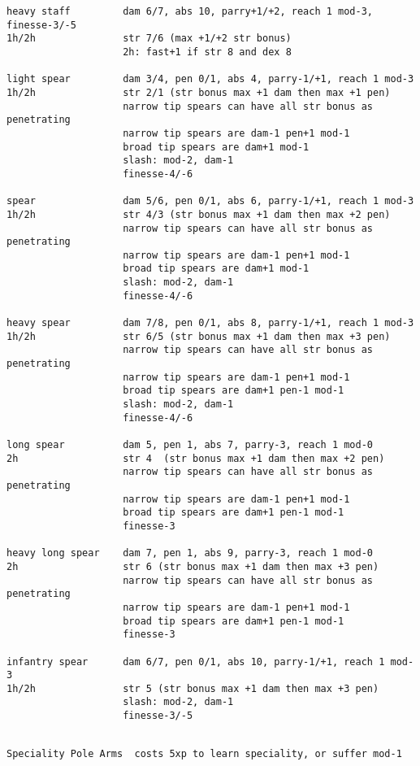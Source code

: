 \begin{verbatim}
heavy staff         dam 6/7, abs 10, parry+1/+2, reach 1 mod-3, finesse-3/-5
1h/2h               str 7/6 (max +1/+2 str bonus)
                    2h: fast+1 if str 8 and dex 8

light spear         dam 3/4, pen 0/1, abs 4, parry-1/+1, reach 1 mod-3
1h/2h               str 2/1 (str bonus max +1 dam then max +1 pen)
                    narrow tip spears can have all str bonus as penetrating
                    narrow tip spears are dam-1 pen+1 mod-1
                    broad tip spears are dam+1 mod-1
                    slash: mod-2, dam-1
                    finesse-4/-6

spear               dam 5/6, pen 0/1, abs 6, parry-1/+1, reach 1 mod-3
1h/2h               str 4/3 (str bonus max +1 dam then max +2 pen)
                    narrow tip spears can have all str bonus as penetrating
                    narrow tip spears are dam-1 pen+1 mod-1
                    broad tip spears are dam+1 mod-1
                    slash: mod-2, dam-1
                    finesse-4/-6

heavy spear         dam 7/8, pen 0/1, abs 8, parry-1/+1, reach 1 mod-3
1h/2h               str 6/5 (str bonus max +1 dam then max +3 pen)
                    narrow tip spears can have all str bonus as penetrating
                    narrow tip spears are dam-1 pen+1 mod-1
                    broad tip spears are dam+1 pen-1 mod-1
                    slash: mod-2, dam-1
                    finesse-4/-6

long spear          dam 5, pen 1, abs 7, parry-3, reach 1 mod-0
2h                  str 4  (str bonus max +1 dam then max +2 pen)
                    narrow tip spears can have all str bonus as penetrating
                    narrow tip spears are dam-1 pen+1 mod-1
                    broad tip spears are dam+1 pen-1 mod-1
                    finesse-3

heavy long spear    dam 7, pen 1, abs 9, parry-3, reach 1 mod-0
2h                  str 6 (str bonus max +1 dam then max +3 pen)
                    narrow tip spears can have all str bonus as penetrating
                    narrow tip spears are dam-1 pen+1 mod-1
                    broad tip spears are dam+1 pen-1 mod-1
                    finesse-3

infantry spear      dam 6/7, pen 0/1, abs 10, parry-1/+1, reach 1 mod-3
1h/2h               str 5 (str bonus max +1 dam then max +3 pen)
                    slash: mod-2, dam-1
                    finesse-3/-5


\end{verbatim} \pagebreak[1] \begin{verbatim}
Speciality Pole Arms  costs 5xp to learn speciality, or suffer mod-1


\end{verbatim}
